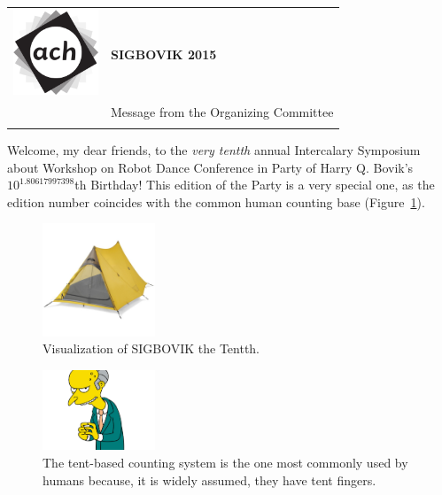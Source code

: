\documentclass[12pt]{article}
\begin{document}
{\sffamily
\begin{tabular}{ll}
\multirow{3}{1in}{\includegraphics[width=1in]{ach.png}}\\
& \textbf{\Huge{SIGBOVIK 2015}} \\ &\\
& \LARGE{Message from the Organizing Committee} \\
&\\
\hline
\end{tabular}}
\vspace{2em}

Welcome, my dear friends, to the {\em very tentth} annual
Intercalary Symposium about Workshop on Robot Dance Conference in Party of Harry Q. Bovik's $10^{1.80617997398}$th Birthday!
This edition of the Party is a very special one, as the edition number coincides with the common human counting base (Figure~\ref{fig:fingers}).

\begin{figure}[h]
	\centering
	\includegraphics[width=0.3\textwidth]{tent.jpg}
	\caption{Visualization of SIGBOVIK the Tentth.}
\end{figure}

\begin{figure}[h]
	\centering
	\includegraphics[width=0.3\textwidth]{tent-fingers.png}
	\caption{The tent-based counting system is the one most commonly used by humans because,
	it is widely assumed, they have tent fingers.} 
	\label{fig:fingers}
\end{figure}
\end{document}
